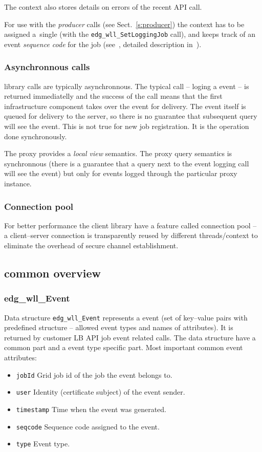 The context also stores details on errors of the recent API call.

For use with the \emph{producer} calls (see Sect.~\ref{s:producer})
the context has to be assigned a~single \jobid
(with the \verb'edg_wll_SetLoggingJob' call),
and keeps track of an event \emph{sequence code} for the job 
(see~\cite{LBUG}, detailed description in~\cite{lbarch}).

\subsubsection{Asynchronnous calls}
\LB library calls are typically asynchronnous. The typical call --
loging a event -- is returned immediatelly and the success of the call
means that the first \LB infrastructure component takes over the event
for delivery. The event itself is queued for delivery to the \LB
server, so there is no guarantee that subsequent query will see the
event. This is not true for new job registration. It is the operation done
synchronously.

The \LB proxy provides a \emph{local view} semantics. The \LB proxy
query semantics is synchronnous (there is a guarantee that a query
next to the event logging call will see the event) but only for events
logged through the particular \LB proxy instance.

\subsubsection{Connection pool}
For better performance the \LB client library have a feature called
connection pool -- a client--server connection is transparently reused
by different threads/context to eliminate the overhead of secure
channel establishment.

\subsection{\LB common overview}

\subsubsection{edg\_wll\_Event}
Data structure \texttt{edg\_wll\_Event} represents a \LB event (set of
key--value pairs with predefined structure -- allowed event types and
names of attributes). It is returned by customer LB API job event
related calls. The data structure have a common part and a event
type specific part. Most important common event attributes:
\begin{itemize}
  \item \texttt{jobId} Grid job id of the job the event belongs to.
  \item \texttt{user} Identity (certificate subject) of the event sender.
  \item \texttt{timestamp} Time when the event was generated.
  \item \texttt{seqcode} Sequence code assigned to the event.
  \item \texttt{type} Event type.
\end{itemize}

